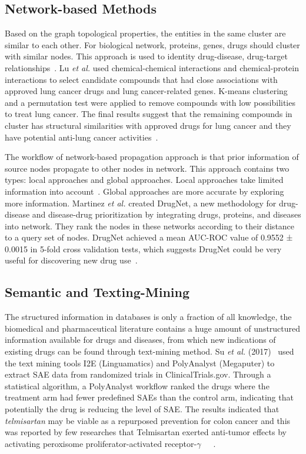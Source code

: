 \subsection{Network-based Methods}

Based on the graph topological properties, the entities in the same cluster are similar to each other. For biological network, proteins, genes, drugs should cluster with similar nodes. This approach is used to identity drug-disease, drug-target relationships~\cite{xue_review_2018}. Lu \textit{et al.} used chemical-chemical interactions and chemical-protein interactions to select candidate compounds that had close associations with approved lung cancer drugs and lung cancer-related genes. K-means clustering and a permutation test were applied to remove compounds with low possibilities to treat lung cancer. The final results suggest that the remaining compounds in cluster has structural similarities with approved drugs for lung cancer and they have potential anti-lung cancer activities~\cite{lu_identification_2016}.

The workflow of network-based propagation approach is that prior information of source nodes propagate to other nodes in network. This approach contains two types: local approaches and global approaches. Local approaches take limited information into account~\cite{xue_review_2018}. Global approaches are more accurate by exploring more information. Martinez \textit{et al.} created DrugNet, a new methodology for drug-disease and disease-drug prioritization by integrating drugs, proteins, and diseases into network. They rank the nodes in these networks according to their distance to a query set of nodes. DrugNet achieved a mean AUC-ROC value of 0.9552 ± 0.0015 in 5-fold cross validation tests, which suggests DrugNet could be very useful for discovering new drug use~\cite{martinez_drugnet:_2015}.

\subsection{Semantic and Texting-Mining}

The structured information in databases is only a fraction of all knowledge, the biomedical and pharmaceutical literature contains a huge amount of  unstructured information available for drugs and diseases, from which new indications of existing drugs can be found through text-mining method. Su \textit{et al.} (2017)~\cite{su_systematic_2017} used the text mining tools I2E (Linguamatics) and PolyAnalyst (Megaputer) to extract \ac{SAE} data from randomized trials in ClinicalTrials.gov. Through a statistical algorithm, a PolyAnalyst workflow ranked the drugs where the treatment arm had fewer predefined \ac{SAE}s than the control arm, indicating that potentially the drug is reducing the level of \ac{SAE}. The results indicated that \textit{telmisartan} may be viable as a repurposed prevention for colon cancer and this was reported by few researches that Telmisartan exerted anti-tumor effects by activating peroxisome proliferator-activated receptor-$\gamma$~\cite{li_telmisartan_2014}~\cite{pu_telmisartan_2016}~\cite{wu_increase_2016}.

